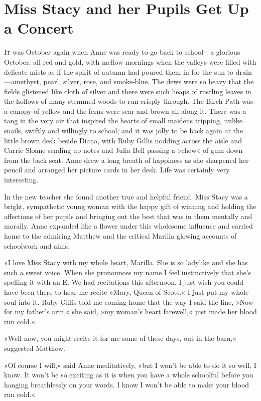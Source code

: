 \chapter{Miss Stacy and her Pupils Get Up a Concert}

\lettrine[lines=4]{I}{t} was October again when Anne was ready to go back to school—a glorious October, all red and gold, with mellow mornings when the valleys were filled with delicate mists as if the spirit of autumn had poured them in for the sun to drain—amethyst, pearl, silver, rose, and smoke-blue. The dews were so heavy that the fields glistened like cloth of silver and there were such heaps of rustling leaves in the hollows of many-stemmed woods to run crisply through. The Birch Path was a canopy of yellow and the ferns were sear and brown all along it. There was a tang in the very air that inspired the hearts of small maidens tripping, unlike snails, swiftly and willingly to school; and it was jolly to be back again at the little brown desk beside Diana, with Ruby Gillis nodding across the aisle and Carrie Sloane sending up notes and Julia Bell passing a »chew« of gum down from the back seat. Anne drew a long breath of happiness as she sharpened her pencil and arranged her picture cards in her desk. Life was certainly very interesting.

In the new teacher she found another true and helpful friend. Miss Stacy was a bright, sympathetic young woman with the happy gift of winning and holding the affections of her pupils and bringing out the best that was in them mentally and morally. Anne expanded like a flower under this wholesome influence and carried home to the admiring Matthew and the critical Marilla glowing accounts of schoolwork and aims.

»I love Miss Stacy with my whole heart, Marilla. She is so ladylike and she has such a sweet voice. When she pronounces my name I feel instinctively that she's spelling it with an E. We had recitations this afternoon. I just wish you could have been there to hear me recite »Mary, Queen of Scots.« I just put my whole soul into it. Ruby Gillis told me coming home that the way I said the line, »Now for my father's arm,« she said, »my woman's heart farewell,« just made her blood run cold.«

»Well now, you might recite it for me some of these days, out in the barn,« suggested Matthew.

»Of course I will,« said Anne meditatively, »but I won't be able to do it so well, I know. It won't be so exciting as it is when you have a whole schoolful before you hanging breathlessly on your words. I know I won't be able to make your blood run cold.«

